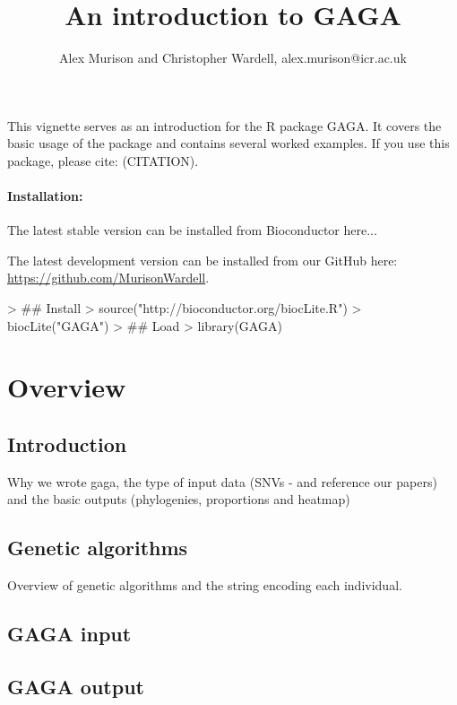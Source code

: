 \documentclass{article}
\begin{document}



\title{An introduction to GAGA}
\author{Alex Murison and Christopher Wardell, alex.murison@icr.ac.uk}
\maketitle

This vignette serves as an introduction for the R package GAGA.  It covers the basic usage of the package and contains several worked examples.  If you use this package, please cite: (CITATION).

\paragraph{Installation:} The latest stable version can be installed from Bioconductor here...
 
The latest development version can be installed from our GitHub here: \href{https://github.com/MurisonWardell}{https://github.com/MurisonWardell}.

\begin{Schunk}
\begin{Sinput}
> ## Install
> source("http://bioconductor.org/biocLite.R")
> biocLite("GAGA")
> ## Load
> library(GAGA)
\end{Sinput}
\end{Schunk}

\pagebreak
\tableofcontents
\pagebreak

\section{Overview}
\subsection{Introduction}
Why we wrote gaga, the type of input data (SNVs - and reference our papers) and the basic outputs (phylogenies, proportions and heatmap)

\subsection{Genetic algorithms}
Overview of genetic algorithms and the string encoding each individual.
\subsection{GAGA input}
\subsection{GAGA output}
\end{document}
